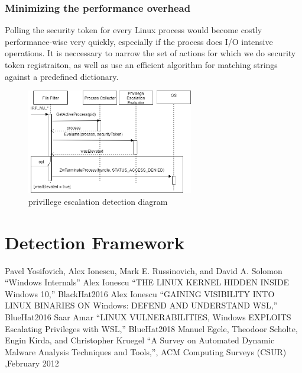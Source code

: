\documentclass[conference]{IEEEtran}
\begin{document}
    \subsubsection{Minimizing the performance overhead}
    Polling the security token for every Linux process would become costly performance-wise very quickly, especially if the process does I/O
    intensive operations. It is neccessary to narrow the set of actions for which we do security token registraiton, as well as use an efficient
    algorithm for matching strings against a predefined dictionary.\\

    \begin{figure}[htbp]
        \centerline{\includegraphics[width=275px,keepaspectratio]{DetectionDiagram.png}}
        \caption{privillege escalation detection diagram}
        \label{fig2}
    \end{figure}

\section{Detection Framework}


\begin{thebibliography}{00}
 Pavel Yosifovich, Alex Ionescu, Mark E. Russinovich, and  David A. Solomon ``Windows Internals''
 Alex Ionescu ``THE LINUX KERNEL HIDDEN INSIDE Windows 10,'' BlackHat2016
 Alex Ionescu ``GAINING VISIBILITY INTO LINUX BINARIES ON Windows: DEFEND AND UNDERSTAND WSL,'' BlueHat2016
 Saar Amar ``LINUX VULNERABILITIES, Windows EXPLOITS Escalating Privileges with WSL,'' BlueHat2018
 Manuel Egele, Theodoor Scholte, Engin Kirda, and Christopher Kruegel ``A Survey on Automated Dynamic Malware Analysis Techniques and Tools,'', ACM Computing Surveys (CSUR) ,February 2012
\end{thebibliography}
\end{document}
